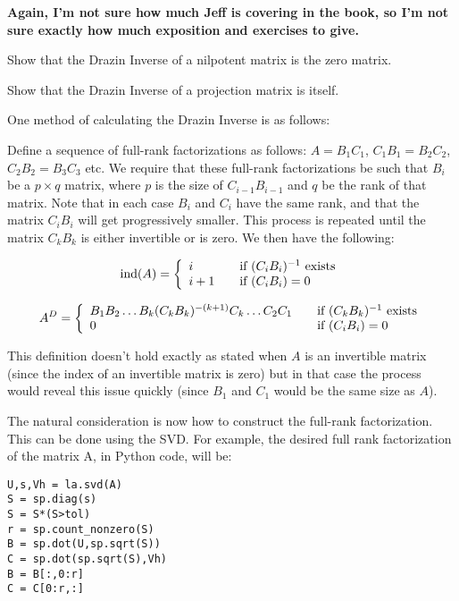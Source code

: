 {\bf Again, I'm not sure how much Jeff is covering in the book, so I'm not sure exactly how much exposition and exercises to give.}
\begin{problem}
Show that the Drazin Inverse of a nilpotent matrix is the zero matrix.
\end{problem}

\begin{problem}
Show that the Drazin Inverse of a projection matrix is itself.
\end{problem}


One method of calculating the Drazin Inverse is as follows:

Define a sequence of full-rank factorizations as follows: $A = B_1 C_1$, $C_1 B_1 = B_2 C_2$, $C_2 B_2 = B_3 C_3$ etc. We require that these full-rank factorizations be such that $B_i$ be a $p \times q$ matrix, where $p$ is the size of $C_{i-1} B_{i-1}$ and $q$ be the rank of that matrix. Note that in each case $B_i$ and $C_i$ have the same rank, and that the matrix $C_i B_i$ will get progressively smaller. This process is repeated until the matrix $C_k B_k$ is either invertible or is zero. We then have the following:

\[
\text{ind}(A) = \left\{
\begin{array} {l l}
i & \quad \text{if  $(C_i B_i)^{-1}$ exists}\\
i+1 & \quad \text {if  $(C_i B_i) = 0$}\\
\end{array} \right.
\]

\[
A^D = \left\{
\begin{array} {l l}
B_1 B_2 \ldots B_k (C_k B_k)^{-(k+1)} C_k \ldots C_2 C_1 & \quad \text{if } (C_k B_k)^{-1} \text{ exists}\\
0 & \quad \text {if } (C_i B_i) = 0 \\
\end{array} \right.
\]

This definition doesn't hold exactly as stated when $A$ is an invertible matrix (since the index of an invertible matrix is zero) but in that case the process would reveal this issue quickly (since $B_1$ and $C_1$ would be the same size as $A$).

The natural consideration is now how to construct the full-rank factorization. This can be done using the SVD. For example, the desired full rank factorization of the matrix A, in Python code, will be:


\begin{lstlisting}
U,s,Vh = la.svd(A)
S = sp.diag(s)
S = S*(S>tol)
r = sp.count_nonzero(S)
B = sp.dot(U,sp.sqrt(S))
C = sp.dot(sp.sqrt(S),Vh)
B = B[:,0:r]
C = C[0:r,:]
\end{lstlisting}

